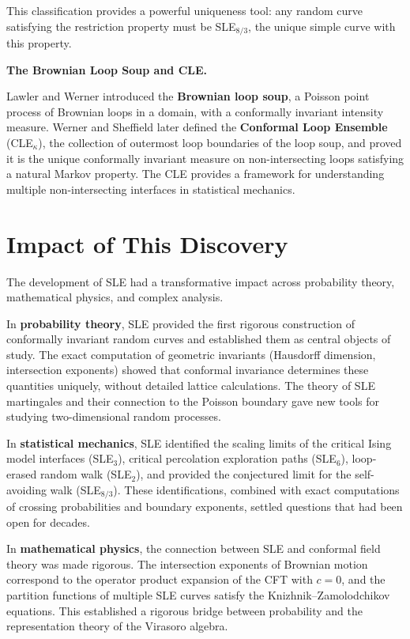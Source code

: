 This classification provides a powerful uniqueness tool: any random curve satisfying the restriction property must be SLE$_{8/3}$, the unique simple curve with this property.

\textbf{The Brownian Loop Soup and CLE.}

Lawler and Werner introduced the \textbf{Brownian loop soup}, a Poisson point process of Brownian loops in a domain, with a conformally invariant intensity measure. Werner and Sheffield later defined the \textbf{Conformal Loop Ensemble} (CLE$_\kappa$), the collection of outermost loop boundaries of the loop soup, and proved it is the unique conformally invariant measure on non-intersecting loops satisfying a natural Markov property. The CLE provides a framework for understanding multiple non-intersecting interfaces in statistical mechanics.

\section{Impact of This Discovery}\label{ch2006wendelinwerner:impact-of-this-discovery}

The development of SLE had a transformative impact across probability theory, mathematical physics, and complex analysis.

In \textbf{probability theory}, SLE provided the first rigorous construction of conformally invariant random curves and established them as central objects of study. The exact computation of geometric invariants (Hausdorff dimension, intersection exponents) showed that conformal invariance determines these quantities uniquely, without detailed lattice calculations. The theory of SLE martingales and their connection to the Poisson boundary gave new tools for studying two-dimensional random processes.

In \textbf{statistical mechanics}, SLE identified the scaling limits of the critical Ising model interfaces (SLE$_3$), critical percolation exploration paths (SLE$_6$), loop-erased random walk (SLE$_2$), and provided the conjectured limit for the self-avoiding walk (SLE$_{8/3}$). These identifications, combined with exact computations of crossing probabilities and boundary exponents, settled questions that had been open for decades.

In \textbf{mathematical physics}, the connection between SLE and conformal field theory was made rigorous. The intersection exponents of Brownian motion correspond to the operator product expansion of the CFT with $c = 0$, and the partition functions of multiple SLE curves satisfy the Knizhnik--Zamolodchikov equations. This established a rigorous bridge between probability and the representation theory of the Virasoro algebra.

